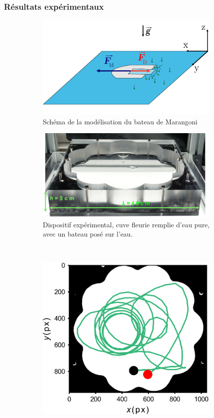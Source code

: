 \documentclass[french, 10pt]{article}
\begin{document}
 
\subsubsection{Résultats expérimentaux}

\begin{figure}[ht]
  \centering
  \begin{subfigure}[b]{0.45\textwidth}
      \centering
      \includegraphics[width=.7\textwidth]{./figures/SchemaModeleBateau.pdf}
	  \caption{Schéma de la modélisation du bateau de Marangoni}
	  \label{fig:schema}
  \end{subfigure}
  \hfill
  \begin{subfigure}[b]{0.45\textwidth}
    \centering
    \includegraphics[width=.7\textwidth]{Cuvefleurie.png}
  \caption{Dispositif expérimental, cuve fleurie remplie d'eau pure, avec un bateau posé sur l'eau.}
  \label{fig:cuve}
\end{subfigure}\\
\begin{subfigure}[b]{0.45\textwidth}
  \centering
  \includegraphics[width=.7\textwidth]{SuiviBateau.png}

\end{subfigure}
\end{figure}
\end{document}
